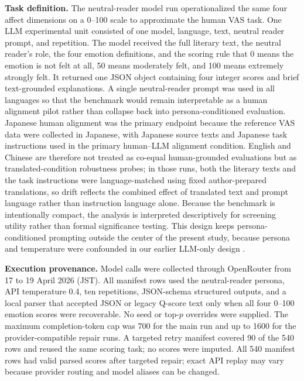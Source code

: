 \documentclass[conference,a4paper]{IEEEtran}
\begin{document}
\textbf{Task definition.} The neutral-reader model run operationalized the same four affect dimensions on a 0--100 scale to approximate the human VAS task. One LLM experimental unit consisted of one model, language, text, neutral reader prompt, and repetition. The model received the full literary text, the neutral reader’s role, the four emotion definitions, and the scoring rule that 0 means the emotion is not felt at all, 50 means moderately felt, and 100 means extremely strongly felt. It returned one JSON object containing four integer scores and brief text-grounded explanations. A single neutral-reader prompt was used in all languages so that the benchmark would remain interpretable as a human alignment pilot rather than collapse back into persona-conditioned evaluation. Japanese human alignment was the primary endpoint because the reference VAS data were collected in Japanese, with Japanese source texts and Japanese task instructions used in the primary human--LLM alignment condition. English and Chinese are therefore not treated as co-equal human-grounded evaluations but as translated-condition robustness probes; in those runs, both the literary texts and the task instructions were language-matched using fixed author-prepared translations, so drift reflects the combined effect of translated text and prompt language rather than instruction language alone. Because the benchmark is intentionally compact, the analysis is interpreted descriptively for screening utility rather than formal significance testing. This design keeps persona-conditioned prompting outside the center of the present study, because persona and temperature were confounded in our earlier LLM-only design \cite{shirahama2026mdpi}.

\textbf{Execution provenance.} Model calls were collected through OpenRouter from 17 to 19 April 2026 (JST). All manifest rows used the neutral-reader persona, API temperature 0.4, ten repetitions, JSON-schema structured outputs, and a local parser that accepted JSON or legacy Q-score text only when all four 0--100 emotion scores were recoverable. No seed or top-$p$ overrides were supplied. The maximum completion-token cap was 700 for the main run and up to 1600 for the provider-compatible repair runs. A targeted retry manifest covered 90 of the 540 rows and reused the same scoring task; no scores were imputed. All 540 manifest rows had valid parsed scores after targeted repair; exact API replay may vary because provider routing and model aliases can be changed.
\end{document}
